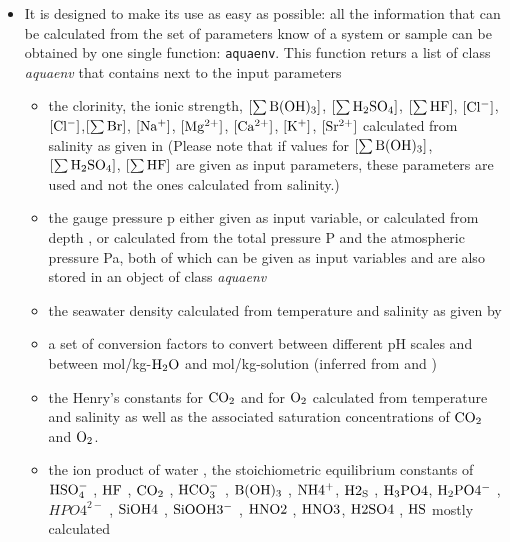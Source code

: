 \documentclass[article,nojss]{jss}
\begin{document}
\begin{itemize}
\item It is designed to make its use as easy as possible: all the information that can be calculated from the set of parameters know of a system or sample
can be obtained by one single function: \texttt{aquaenv}. This function returs a list of class  \textit{aquaenv} that contains next to the input parameters 
\begin{itemize}
\item the clorinity, the ionic strength, $[\rm \sum B(OH)_3]$, $[\rm \sum H_2SO_4]$, $[\rm \sum HF]$, $[\rm Cl^-]$, $[\rm Cl^-]$,$[\rm \sum Br]$, $[\rm Na^+]$, $[\rm Mg^{2+}]$, 
$[\rm Ca^{2+}]$, $[\rm K^{+}]$, $[\rm Sr^{2+}]$ calculated from salinity as given in \cite{DOE1994}
(Please note that if values for $[\rm \sum B(OH)_3]$, $[\rm \sum H_2SO_4]$, $[\rm \sum HF]$ are given as input parameters, these parameters are used and not the ones calculated 
from salinity.)
\item the gauge pressure p \citep[total pressure minus atmospheric pressure][]{Feistel2008} either given as input variable, or calculated from depth \citep[according to][]{Fofonoff1983}, or calculated from the total pressure P and the atmospheric pressure Pa,
both of which can be given as input variables and are also stored in an object of class  \textit{aquaenv}
\item  the seawater density calculated from temperature and salinity as given by \cite{Millero1981}
\item a set of conversion factors to convert between different pH scales \citep{Dickson1984, Zeebe2001} and between mol/kg-$\rm H_2O$ and mol/kg-solution
 (inferred from \cite{Roy1993b} and \cite{DOE1994})
\item the Henry's constants for $\rm CO_2$ \citep{Weiss1974} and for $\rm O_2$ \citep[inferred from][]{Weiss1970} calculated from temperature and salinity as well as the 
associated saturation concentrations of $\rm CO_2$ and $\rm O_2$.
\item the ion product of water \citep{Millero1995}, the stoichiometric equilibrium constants of $\rm HSO_4^-$ \citep{Dickson1990},  $\rm HF$\citep{Dickson1979a} ,
$\rm CO_2$ \citep{Roy1993b}, $\rm HCO_3^-$ \citep{Roy1993b}, $\rm B(OH)_3$ \citep{Dickson1990}, $\rm NH4^+$\citep{Millero1995a}, $\rm H2_S$ \citep{Millero1995},
$\rm H_3PO4$\citep{Millero1995}, $\rm H_2PO4^-$ \citep{Millero1995}, $HPO4^{2-}$ \citep{Millero1995}, $\rm SiOH4$ \citep{Millero1988},         
$\rm SiOOH3^-$ \citep{Wischmeyer2003}, $\rm HNO2$ \citep{Riordan2005}, $\rm HNO3$,  $\rm H2SO4$ \citep{Atkins1996}, $\rm HS$ \citep{Atkins1996} mostly calculated 

\end{itemize}
\end{itemize}
\end{document}
